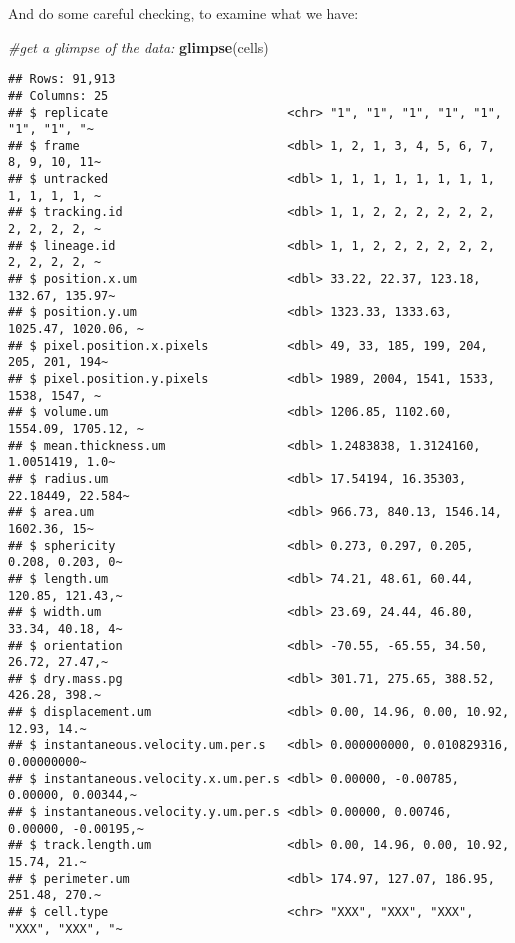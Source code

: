 \documentclass[
]{article}
\newenvironment{Shaded}{\begin{snugshade}}{\end{snugshade}}
\newcommand{\CommentTok}[1]{\textcolor[rgb]{0.56,0.35,0.01}{\textit{#1}}}
\newcommand{\FunctionTok}[1]{\textcolor[rgb]{0.13,0.29,0.53}{\textbf{#1}}}
\newcommand{\NormalTok}[1]{#1}
\begin{document}
And do some careful checking, to examine what we have:

\begin{Shaded}
\begin{Highlighting}[]
\CommentTok{\#get a glimpse of the data:}
\FunctionTok{glimpse}\NormalTok{(cells)}
\end{Highlighting}
\end{Shaded}

\begin{verbatim}
## Rows: 91,913
## Columns: 25
## $ replicate                         <chr> "1", "1", "1", "1", "1", "1", "1", "~
## $ frame                             <dbl> 1, 2, 1, 3, 4, 5, 6, 7, 8, 9, 10, 11~
## $ untracked                         <dbl> 1, 1, 1, 1, 1, 1, 1, 1, 1, 1, 1, 1, ~
## $ tracking.id                       <dbl> 1, 1, 2, 2, 2, 2, 2, 2, 2, 2, 2, 2, ~
## $ lineage.id                        <dbl> 1, 1, 2, 2, 2, 2, 2, 2, 2, 2, 2, 2, ~
## $ position.x.um                     <dbl> 33.22, 22.37, 123.18, 132.67, 135.97~
## $ position.y.um                     <dbl> 1323.33, 1333.63, 1025.47, 1020.06, ~
## $ pixel.position.x.pixels           <dbl> 49, 33, 185, 199, 204, 205, 201, 194~
## $ pixel.position.y.pixels           <dbl> 1989, 2004, 1541, 1533, 1538, 1547, ~
## $ volume.um                         <dbl> 1206.85, 1102.60, 1554.09, 1705.12, ~
## $ mean.thickness.um                 <dbl> 1.2483838, 1.3124160, 1.0051419, 1.0~
## $ radius.um                         <dbl> 17.54194, 16.35303, 22.18449, 22.584~
## $ area.um                           <dbl> 966.73, 840.13, 1546.14, 1602.36, 15~
## $ sphericity                        <dbl> 0.273, 0.297, 0.205, 0.208, 0.203, 0~
## $ length.um                         <dbl> 74.21, 48.61, 60.44, 120.85, 121.43,~
## $ width.um                          <dbl> 23.69, 24.44, 46.80, 33.34, 40.18, 4~
## $ orientation                       <dbl> -70.55, -65.55, 34.50, 26.72, 27.47,~
## $ dry.mass.pg                       <dbl> 301.71, 275.65, 388.52, 426.28, 398.~
## $ displacement.um                   <dbl> 0.00, 14.96, 0.00, 10.92, 12.93, 14.~
## $ instantaneous.velocity.um.per.s   <dbl> 0.000000000, 0.010829316, 0.00000000~
## $ instantaneous.velocity.x.um.per.s <dbl> 0.00000, -0.00785, 0.00000, 0.00344,~
## $ instantaneous.velocity.y.um.per.s <dbl> 0.00000, 0.00746, 0.00000, -0.00195,~
## $ track.length.um                   <dbl> 0.00, 14.96, 0.00, 10.92, 15.74, 21.~
## $ perimeter.um                      <dbl> 174.97, 127.07, 186.95, 251.48, 270.~
## $ cell.type                         <chr> "XXX", "XXX", "XXX", "XXX", "XXX", "~
\end{verbatim}
\end{document}
